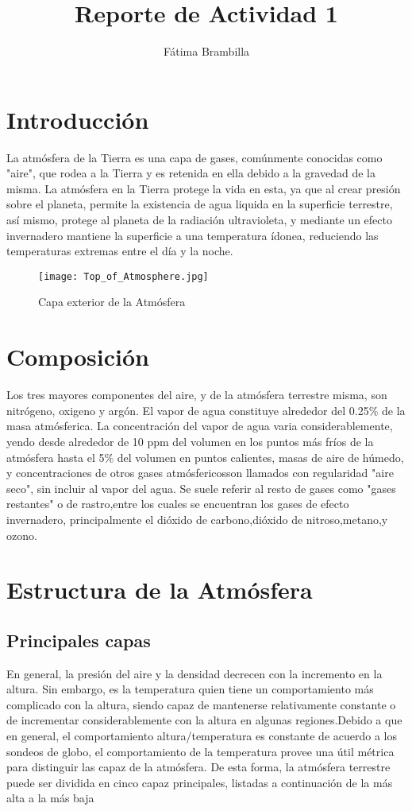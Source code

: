 \documentclass{article}
\title{Reporte de Actividad 1}
\author{Fátima Brambilla}
\begin{document}
\maketitle {}

\section {Introducción}
La atmósfera de la Tierra es una capa de gases, comúnmente conocidas como "aire", que rodea a la Tierra y es retenida en ella debido a la gravedad de la misma. La atmósfera en la Tierra protege la vida en esta, ya que al crear presión sobre el planeta, permite la existencia de agua liquida en la superficie terrestre, así mismo, protege al planeta de la radiación ultravioleta, y mediante un efecto invernadero mantiene la superficie a una temperatura ídonea, reduciendo las temperaturas extremas entre el día y la noche.

\begin{figure}
    \caption{Capa exterior de la Atmósfera}
    \texttt{[image: Top\_of\_Atmosphere.jpg]}
    \centering
    \label{Atmósfera}
\end{figure}

\section{Composición}

Los tres mayores componentes del aire, y de la atmósfera terrestre misma, son nitrógeno, oxigeno y argón. El vapor de agua constituye alrededor del 0.25\% de la masa atmósferica. La concentración del vapor de agua varia considerablemente, yendo desde alrededor de 10 ppm del volumen en los puntos más fríos de la atmósfera hasta el 5\% del volumen en puntos calientes, masas de aire de húmedo, y concentraciones de otros gases atmósfericosson llamados con regularidad "aire seco", sin incluir al vapor del agua.
Se suele referir al resto de gases como "gases restantes" o de rastro,entre los cuales se encuentran los gases de efecto invernadero, principalmente el dióxido de carbono,dióxido de nitroso,metano,y ozono.

\section {Estructura de la Atmósfera}
\subsection {Principales capas}
En general, la presión del aire y la densidad decrecen con la incremento en la altura. Sin embargo, es la temperatura quien tiene un comportamiento más complicado con la altura, siendo capaz de mantenerse relativamente constante o de incrementar considerablemente con la altura en algunas regiones.Debido a que en general, el comportamiento altura/temperatura es constante de acuerdo a los sondeos de globo, el comportamiento de la temperatura provee una útil métrica para distinguir las capaz de la atmósfera.
De esta forma, la atmósfera terrestre puede ser dividida en cinco capaz principales, listadas a continuación de la más alta a la más baja
\end{document}

